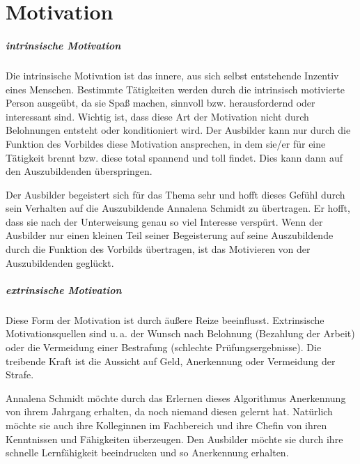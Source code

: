 \chapter{Motivation}

\paragraph{intrinsische Motivation}
Die intrinsische Motivation ist das innere, aus sich selbst entstehende Inzentiv eines Menschen. Bestimmte Tätigkeiten werden durch die intrinsisch motivierte Person ausgeübt, da sie Spaß machen, sinnvoll bzw. herausfordernd oder interessant sind. Wichtig ist, dass diese Art der Motivation nicht durch Belohnungen entsteht oder konditioniert wird. Der Ausbilder kann nur durch die Funktion des Vorbildes diese Motivation ansprechen, in dem sie/er für eine Tätigkeit brennt bzw. diese total spannend und toll findet. Dies kann dann auf den Auszubildenden überspringen. 
\par
Der Ausbilder begeistert sich für das Thema sehr und hofft dieses Gefühl durch sein Verhalten auf die Auszubildende Annalena Schmidt zu übertragen. Er hofft, dass sie nach der Unterweisung genau so viel Interesse verspürt. Wenn der Ausbilder nur einen kleinen Teil seiner Begeisterung auf seine Auszubildende durch die Funktion des Vorbilds übertragen, ist das Motivieren von der Auszubildenden geglückt. 

\paragraph{extrinsische Motivation}
Diese Form der Motivation ist durch äußere Reize beeinflusst. Extrinsische Motivationsquellen sind u.\,a. der Wunsch nach Belohnung (Bezahlung der Arbeit) oder die Vermeidung einer Bestrafung (schlechte Prüfungsergebnisse). Die treibende Kraft ist die Aussicht auf Geld, Anerkennung oder Vermeidung der Strafe.
\par
Annalena Schmidt möchte durch das Erlernen dieses Algorithmus Anerkennung von ihrem Jahrgang erhalten, da noch niemand diesen gelernt hat. Natürlich möchte sie auch ihre Kolleginnen im Fachbereich und ihre Chefin von ihren Kenntnissen und Fähigkeiten überzeugen. Den Ausbilder möchte sie durch ihre schnelle Lernfähigkeit beeindrucken und so Anerkennung erhalten.